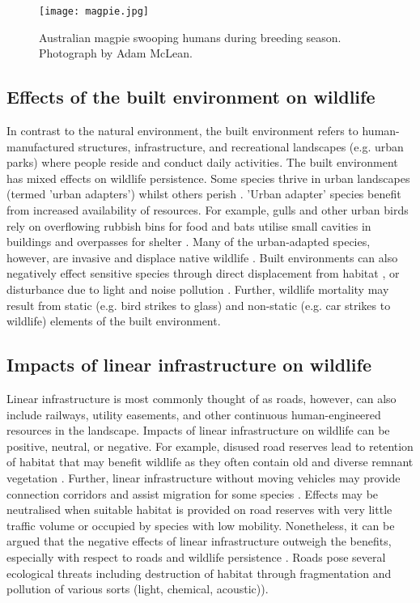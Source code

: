 \begin{figure*}[htp]
  \centering
  \texttt{[image: magpie.jpg]}
  \caption[Wildlife aggression towards humans]{Australian magpie swooping humans during breeding season. Photograph by Adam McLean.}
  \label{magpie}
\end{figure*}

\subsection{Effects of the built environment on wildlife}

In contrast to the natural environment, the built environment refers to human-manufactured structures, infrastructure, and recreational landscapes (e.g. urban parks) where people reside and conduct daily activities.  The built environment has mixed effects on wildlife persistence. Some species thrive in urban landscapes (termed 'urban adapters') whilst others perish \citep{shoc06}. 'Urban adapter' species benefit from increased availability of resources. For example, gulls and other urban birds rely on overflowing rubbish bins for food \citep{ditc06} and bats utilise small cavities in buildings and overpasses for shelter \citep{kunz82}. Many of the urban-adapted species, however, are invasive and displace native wildlife \citep{mcki06}. Built environments can also negatively effect sensitive species through direct displacement from habitat \citep{czec97}, or disturbance due to light and noise pollution \citep{parr16}. Further, wildlife mortality may result from static (e.g. bird strikes to glass) and non-static (e.g. car strikes to wildlife) elements of the built environment. 

\subsection{Impacts of linear infrastructure on wildlife}

Linear infrastructure is most commonly thought of as roads, however, can also include railways, utility easements, and other continuous human-engineered resources in the landscape. Impacts of linear infrastructure on wildlife can be positive, neutral, or negative. For example, disused road reserves lead to retention of habitat that may benefit wildlife as they often contain old and diverse remnant vegetation \citep{benn91}. Further, linear infrastructure without moving vehicles may provide connection corridors and assist migration for some species \citep{rvdr15}. Effects may be neutralised when suitable habitat is provided on road reserves with very little traffic volume or occupied by species with low mobility. Nonetheless, it can be argued that the negative effects of linear infrastructure outweigh the benefits, especially with respect to roads and wildlife persistence \citep{fahr09}. Roads pose several ecological threats including destruction of habitat through fragmentation and pollution of various sorts (light, chemical, acoustic)).

